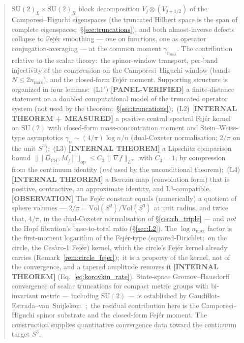 \documentclass[11pt,a4paper]{article}
\theoremstyle{plain}
\theoremstyle{definition}
\newcommand{\nmax}{n_{\max}}
\newcommand{\sthree}{S^{3}}
\newcommand{\opnorm}[1]{\lVert #1 \rVert_{\mathrm{op}}}
\newcommand{\norm}[1]{\lVert #1 \rVert}
\newcommand{\SU}{\mathrm{SU}}
\newcommand{\Vol}{\mathrm{Vol}}
\newcommand{\Mat}{M}
\newcommand{\DCH}{D_{\mathrm{CH}}}
\newcommand{\gvc}[2]{#2}
\begin{document}
\begin{abstract}
$\mathrm{SU}(2)_L \times \mathrm{SU}(2)_R$ block decomposition
$V_j \otimes (V_{j \pm 1/2})$ of the Camporesi--Higuchi eigenspaces
(the truncated Hilbert space is the span of complete eigenspaces;\ \S\ref{sec:truncations}),
and both almost-inverse defects collapse to Fej\'er smoothing — one
on functions, one as operator conjugation-averaging — at the common
moment $\gamma_{\nmax}$. The contribution relative to the scalar
theory:\ the spinor-window transport, per-band injectivity of the
compression on the Camporesi--Higuchi window (bands $N \le 2\nmax$), and the
closed-form Fej\'er moment.
Supporting structure is organized in four lemmas:\ (L1$'$) \textbf{[PANEL-VERIFIED]} a
finite-distance statement on a doubled computational model of the
truncated operator system (not used by the theorem;\ \S\ref{sec:truncations});\ (L2)
\textbf{[INTERNAL THEOREM + MEASURED]} \gvc{p38-rate-constant}{a positive
central spectral Fej\'er kernel on $\SU(2)$ with closed-form
mass-concentration moment and Stein--Weiss-type asymptotics
$\gamma_n \sim (4/\pi)\log n / n$ (dual-Coxeter normalisation; $2/\pi$ on the unit $\sthree$)};\ (L3) \textbf{[INTERNAL THEOREM]} a
Lipschitz comparison bound
$\opnorm{[\DCH, \Mat_f]} \leq C_3\,\norm{\nabla f}_{L^\infty}$ with
$C_3 = 1$, by compression from the continuum identity (\emph{not} used
by the unconditional theorem);\ (L4)
\textbf{[INTERNAL THEOREM]} a Berezin map (convolution form) that is positive,
contractive, an approximate identity, and L3-compatible.
\textbf{[OBSERVATION]} The
Fej\'er constant equals (numerically) a quotient of sphere volumes ---
$2/\pi = \Vol(S^2)/\Vol(\sthree)$ at unit radius, and twice that,
$4/\pi$, in the dual-Coxeter normalisation of \S\ref{sec:ch_triple} --- and \emph{not} the Hopf
fibration's base-to-total ratio (\S\ref{sec:L2}). The $\log\nmax$
factor is the first-moment logarithm of the Fej\'er-type
(squared-Dirichlet;\ on the circle, the Ces\`aro-1 Fej\'er) kernel, which the circle's Fej\'er kernel already carries
(Remark~\ref{rem:circle_fejer});\ it is a property of the kernel, not of
the convergence, and a tapered amplitude removes it \textbf{[INTERNAL THEOREM]}
(Eq.~\eqref{eq:korovkin_rate}).
State-space Gromov--Hausdorff convergence of scalar truncations for
compact metric groups with bi-invariant metric — including $\SU(2)$ — is
established by Gaudillot-Estrada--van~Suijlekom~\cite{gaudillot_vs2025};\
the residual contribution here is the
Camporesi--Higuchi spinor substrate and the closed-form Fej\'er
moment. The construction supplies
quantitative convergence data toward the continuum target $\sthree$,

\end{abstract}
\end{document}

